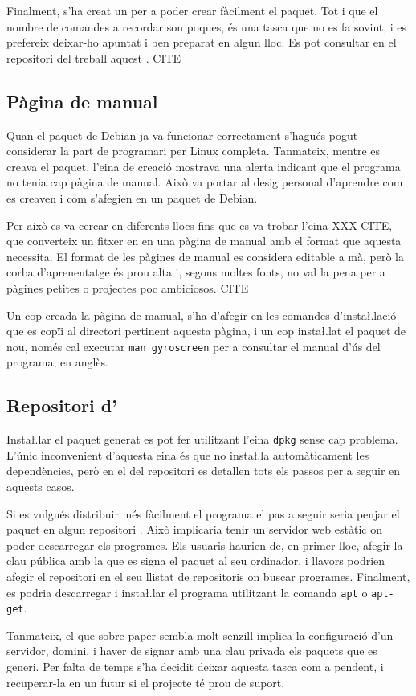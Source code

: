 Finalment, s'ha creat un  per a poder crear fàcilment el
paquet. Tot i que el nombre de comandes a recordar son poques, és una tasca que
no es fa sovint, i es prefereix deixar-ho apuntat i ben preparat en algun lloc.
Es pot consultar en el repositori del treball aquest . CITE

\subsection{Pàgina de manual}

Quan el paquet de Debian ja va funcionar correctament s'hagués pogut considerar
la part de programari per Linux completa. Tanmateix, mentre es creava el paquet,
l'eina de creació mostrava una alerta indicant que el programa no tenia cap
pàgina de manual. Això va portar al desig personal d'aprendre com es creaven
i com s'afegien en un paquet de Debian.

Per això es va cercar en diferents llocs fins que es va trobar l'eina XXX CITE,
que converteix un fitxer en  en una pàgina de manual amb el
format que aquesta necessita. El format de les pàgines de manual es considera
editable a mà, però la corba d'aprenentatge és prou alta i, segons moltes fonts,
no val la pena per a pàgines petites o projectes poc ambiciosos. CITE

Un cop creada la pàgina de manual, s'ha d'afegir en les comandes d'insta\l.lació
que es copïi al directori pertinent aquesta pàgina, i un cop insta\l.lat el
paquet de nou, només cal executar \verb|man gyroscreen| per a consultar el
manual d'ús del programa, en anglès.

\subsection{Repositori d'}

Insta\l.lar el paquet generat es pot fer utilitzant l'eina \verb|dpkg| sense cap
problema. L'únic inconvenient d'aquesta eina és que no insta\l.la automàticament
les dependències, però en el  del repositori es detallen tots els
passos per a seguir en aquests casos.

Si es vulgués distribuir més fàcilment el programa el pas a seguir seria
penjar el paquet en algun repositori . Això implicaria tenir un servidor
web estàtic on poder descarregar els programes. Els usuaris haurien de, en primer
lloc, afegir la clau pública amb la que es signa el paquet al seu ordinador, i
llavors podrien afegir el repositori  en el seu llistat de repositoris
on buscar programes. Finalment, es podria descarregar i insta\l.lar el programa
utilitzant la comanda \verb|apt| o \verb|apt-get|.

Tanmateix, el que sobre paper sembla molt senzill implica la configuració d'un
servidor, domini, i haver de signar amb una clau privada els paquets que es
generi. Per falta de temps s'ha decidit deixar aquesta tasca com a pendent, i
recuperar-la en un futur si el projecte té prou de suport.
